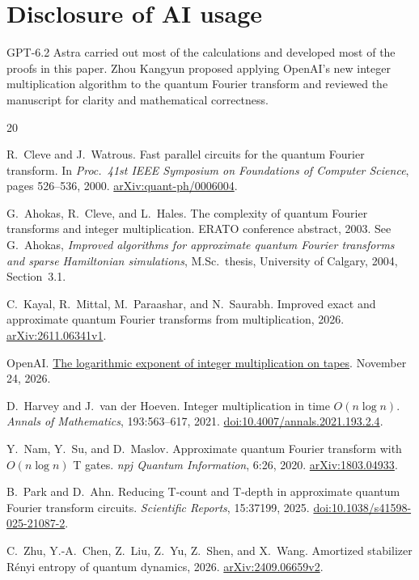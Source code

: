 \documentclass[11pt]{article}
\newcommand{\arx}[1]{\href{https://arxiv.org/abs/#1}{arXiv:#1}}
\newcommand{\oaipaper}[2]{\href{https://github.com/openai/math/blob/main/preprints/#1-November-24-2026/paper.pdf}{#2}}
\begin{document}
\section*{Disclosure of AI usage}
GPT-6.2 Astra carried out most of the calculations and developed most of the proofs in this paper. Zhou Kangyun proposed applying OpenAI's new integer multiplication algorithm to the quantum Fourier transform and reviewed the manuscript for clarity and mathematical correctness.

\begin{thebibliography}{20}\small\setlength{\itemsep}{1pt}\setlength{\parskip}{0pt}\setlength{\baselineskip}{11.6pt}

R.~Cleve and J.~Watrous.
Fast parallel circuits for the quantum Fourier transform.
In \emph{Proc.\ 41st IEEE Symposium on Foundations of Computer Science}, pages 526--536, 2000.
\arx{quant-ph/0006004}.

G.~Ahokas, R.~Cleve, and L.~Hales.
The complexity of quantum Fourier transforms and integer multiplication.
ERATO conference abstract, 2003.
See G.~Ahokas, \emph{Improved algorithms for approximate quantum Fourier transforms and sparse Hamiltonian simulations}, M.Sc.\ thesis, University of Calgary, 2004, Section~3.1.

C.~Kayal, R.~Mittal, M.~Paraashar, and N.~Saurabh.
Improved exact and approximate quantum Fourier transforms from multiplication, 2026.
\arx{2611.06341v1}.

OpenAI.
\oaipaper{The-logarithmic-exponent-of-integer-multiplication-on-tapes}{The logarithmic exponent of integer multiplication on tapes}.
November 24, 2026.

D.~Harvey and J.~van der Hoeven.
Integer multiplication in time $O(n\log n)$.
\emph{Annals of Mathematics}, 193:563--617, 2021.
\href{https://doi.org/10.4007/annals.2021.193.2.4}{doi:10.4007/annals.2021.193.2.4}.

Y.~Nam, Y.~Su, and D.~Maslov.
Approximate quantum Fourier transform with $O(n\log n)$ T gates.
\emph{npj Quantum Information}, 6:26, 2020.
\arx{1803.04933}.

B.~Park and D.~Ahn.
Reducing T-count and T-depth in approximate quantum Fourier transform circuits.
\emph{Scientific Reports}, 15:37199, 2025.
\href{https://doi.org/10.1038/s41598-025-21087-2}{doi:10.1038/s41598-025-21087-2}.

C.~Zhu, Y.-A.~Chen, Z.~Liu, Z.~Yu, Z.~Shen, and X.~Wang.
Amortized stabilizer R\'{e}nyi entropy of quantum dynamics, 2026.
\arx{2409.06659v2}.


\end{thebibliography}
\end{document}
